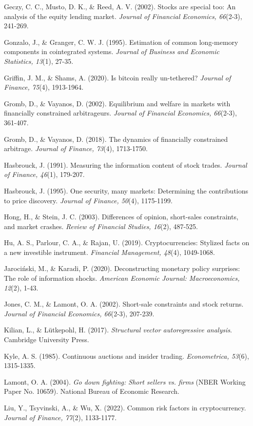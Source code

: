 \documentclass[
]{article}
\begin{document}
Geczy, C. C., Musto, D. K., \& Reed, A. V. (2002). Stocks are special
too: An analysis of the equity lending market. \emph{Journal of
Financial Economics, 66}(2-3), 241-269.

Gonzalo, J., \& Granger, C. W. J. (1995). Estimation of common
long-memory components in cointegrated systems. \emph{Journal of
Business and Economic Statistics, 13}(1), 27-35.

Griffin, J. M., \& Shams, A. (2020). Is bitcoin really un-tethered?
\emph{Journal of Finance, 75}(4), 1913-1964.

Gromb, D., \& Vayanos, D. (2002). Equilibrium and welfare in markets
with financially constrained arbitrageurs. \emph{Journal of Financial
Economics, 66}(2-3), 361-407.

Gromb, D., \& Vayanos, D. (2018). The dynamics of financially
constrained arbitrage. \emph{Journal of Finance, 73}(4), 1713-1750.

Hasbrouck, J. (1991). Measuring the information content of stock trades.
\emph{Journal of Finance, 46}(1), 179-207.

Hasbrouck, J. (1995). One security, many markets: Determining the
contributions to price discovery. \emph{Journal of Finance, 50}(4),
1175-1199.

Hong, H., \& Stein, J. C. (2003). Differences of opinion, short-sales
constraints, and market crashes. \emph{Review of Financial Studies,
16}(2), 487-525.

Hu, A. S., Parlour, C. A., \& Rajan, U. (2019). Cryptocurrencies:
Stylized facts on a new investible instrument. \emph{Financial
Management, 48}(4), 1049-1068.

Jarociński, M., \& Karadi, P. (2020). Deconstructing monetary policy
surprises: The role of information shocks. \emph{American Economic
Journal: Macroeconomics, 12}(2), 1-43.

Jones, C. M., \& Lamont, O. A. (2002). Short-sale constraints and stock
returns. \emph{Journal of Financial Economics, 66}(2-3), 207-239.

Kilian, L., \& Lütkepohl, H. (2017). \emph{Structural vector
autoregressive analysis}. Cambridge University Press.

Kyle, A. S. (1985). Continuous auctions and insider trading.
\emph{Econometrica, 53}(6), 1315-1335.

Lamont, O. A. (2004). \emph{Go down fighting: Short sellers vs. firms}
(NBER Working Paper No. 10659). National Bureau of Economic Research.

Liu, Y., Tsyvinski, A., \& Wu, X. (2022). Common risk factors in
cryptocurrency. \emph{Journal of Finance, 77}(2), 1133-1177.
\end{document}
